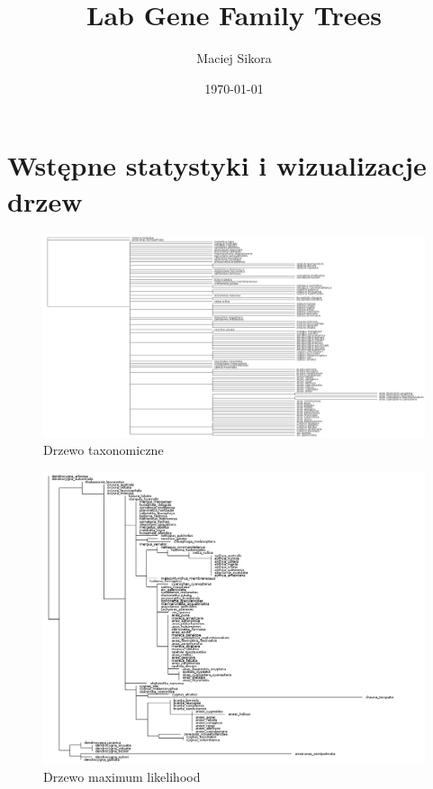 \documentclass[12pt]{article}
\title{Lab Gene Family Trees}
\author{Maciej Sikora}
\date{\specialdate\today}
\begin{document}
\maketitle

\section{Wstępne statystyki i wizualizacje drzew}

\begin{figure}[H]
\begin{center}
\includegraphics[width=\textwidth]{taxonomy}
\caption{Drzewo taxonomiczne}
\end{center}
\end{figure}

\begin{figure}[H]
\begin{center}
\includegraphics[width=\textwidth]{ml}
\caption{Drzewo maximum likelihood}
\end{center}
\end{figure}
\end{document}
